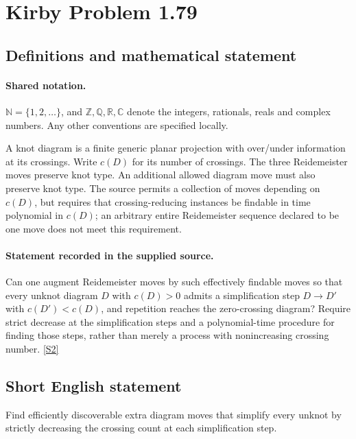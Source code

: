 \documentclass[11pt]{article}
\newcommand{\sref}[2]{\hyperlink{source:#1:#2}{[S#2]}}
\begin{document}
\section{Kirby Problem 1.79}\label{statement}

\subsection{Definitions and mathematical statement}

\paragraph{Shared notation.}$\mathbb N=\{1,2,\ldots\}$, and $\mathbb Z,\mathbb Q,\mathbb R,\mathbb C$ denote the integers, rationals, reals and complex numbers. Any other conventions are specified locally.


A knot diagram is a finite generic planar projection with over/under information at its crossings. Write $c(D)$ for its number of crossings. The three Reidemeister moves preserve knot type. An additional allowed diagram move must also preserve knot type. The source permits a collection of moves depending on $c(D)$, but requires that crossing-reducing instances be findable in time polynomial in $c(D)$; an arbitrary entire Reidemeister sequence declared to be one move does not meet this requirement.
\paragraph{Statement recorded in the supplied source.}
Can one augment Reidemeister moves by such effectively findable moves so that every unknot diagram $D$ with $c(D)>0$ admits a simplification step $D\to D'$ with $c(D')<c(D)$, and repetition reaches the zero-crossing diagram? Require strict decrease at the simplification steps and a polynomial-time procedure for finding those steps, rather than merely a process with nonincreasing crossing number. \sref{statement}{2}

\subsection{Short English statement}
Find efficiently discoverable extra diagram moves that simplify every unknot by strictly decreasing the crossing count at each simplification step.
\end{document}
